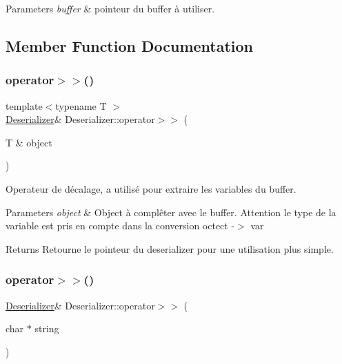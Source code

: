 \begin{DoxyParams}{Parameters}
{\em buffer} & pointeur du buffer à utiliser. \\
\hline
\end{DoxyParams}


\subsection{Member Function Documentation}
\mbox{\label{struct_deserializer_acda0fe1ee62c4f5de3d70104a20bc41a}} 
\subsubsection{\texorpdfstring{operator$>$$>$()}{operator>>()}\hspace{0.1cm}{\footnotesize\ttfamily [1/2]}}
{\footnotesize\ttfamily template$<$typename T $>$ \\
\hyperlink{struct_deserializer}{Deserializer}\& Deserializer\+::operator$>$$>$ (\begin{DoxyParamCaption}\item[{T \&}]{object }\end{DoxyParamCaption})\hspace{0.3cm}{\ttfamily [inline]}}



Operateur de décalage, a utilisé pour extraire les variables du buffer. 


\begin{DoxyParams}{Parameters}
{\em object} & Object à complêter avec le buffer. Attention le type de la variable est pris en compte dans la conversion octect -\/$>$ var\\
\hline
\end{DoxyParams}
\begin{DoxyReturn}{Returns}
Retourne le pointeur du deserializer pour une utilisation plus simple. 
\end{DoxyReturn}
\mbox{\label{struct_deserializer_aef72a346514298e1e71e69e9aef3b96f}} 
\subsubsection{\texorpdfstring{operator$>$$>$()}{operator>>()}\hspace{0.1cm}{\footnotesize\ttfamily [2/2]}}
{\footnotesize\ttfamily \hyperlink{struct_deserializer}{Deserializer}\& Deserializer\+::operator$>$$>$ (\begin{DoxyParamCaption}\item[{char $\ast$}]{string }\end{DoxyParamCaption})\hspace{0.3cm}{\ttfamily [inline]}}



